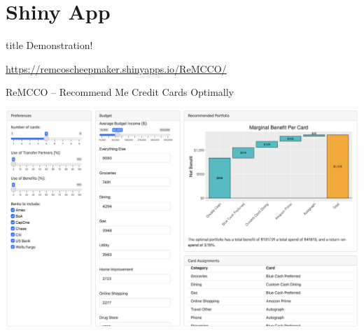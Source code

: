 


\section{Shiny App}

\begin{frame}
    \vfill
    \centering
    \begin{beamercolorbox}[sep=8pt,center,shadow=true,rounded=true]{title}
      Demonstration!
    \end{beamercolorbox}
    \url{https://remcoscheepmaker.shinyapps.io/ReMCCO/}
    \vfill
\end{frame}

\begin{frame}{ReMCCO -- Recommend Me Credit Cards Optimally}
    \begin{center}
        \includegraphics[width=1.0\textwidth]{../Misc/ReMCCO.png}
    \end{center}
\end{frame} 

